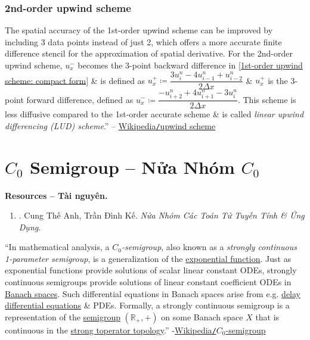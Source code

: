 \documentclass{article}
\begin{document}
\subsubsection{2nd-order upwind scheme}
The spatial accuracy of the 1st-order upwind scheme can be improved by including 3 data points instead of just 2, which offers a more accurate finite difference stencil for the approximation of spatial derivative. For the 2nd-order upwind scheme, $u_x^-$ becomes the 3-point backward difference in \eqref{1st-order upwind scheme: compact form} \& is defined as $u_x^+\coloneqq\dfrac{3u_i^n - 4u_{i-1}^n + u_{i-2}^n}{2\Delta x}$ \& $u_x^+$ is the 3-point forward difference, defined as $u_x^-\coloneqq\dfrac{-u_{i+2}^n + 4u_{i+1}^n - 3u_i^n}{2\Delta x}$. This scheme is less diffusive compared to the 1st-order accurate scheme \& is called {\it linear upwind differencing (LUD) scheme}.'' -- \href{https://en.wikipedia.org/wiki/Upwind_scheme}{Wikipedia{\tt/}upwind scheme}


\section{$C_0$ Semigroup -- Nửa Nhóm $C_0$}
\textbf{\textsf{Resources -- Tài nguyên.}}
\begin{enumerate}
	\item \cite{Anh_Ke_semigroup}. {\sc Cung Thế Anh, Trần Đình Kế}. {\it Nửa Nhóm Các Toán Tử Tuyến Tính \& Ứng Dụng}.
\end{enumerate}
``In mathematical analysis, a {\it $C_0$-semigroup}, also known as a {\it strongly continuous 1-parameter semigroup}, is a generalization of the \href{https://en.wikipedia.org/wiki/Exponential_function}{exponential function}. Just as exponential functions provide solutions of scalar linear constant ODEs, strongly continuous semigroups provide solutions of linear constant coefficient ODEs in \href{https://en.wikipedia.org/wiki/Banach_space}{Banach spaces}. Such differential equations in Banach spaces arise from e.g. \href{https://en.wikipedia.org/wiki/Delay_differential_equation}{delay differential equations} \& PDEs. Formally, a strongly continuous semigroup is a representation of the \href{https://en.wikipedia.org/wiki/Semigroup}{semigroup} $(\mathbb{R}_+,+)$ on some Banach space $X$ that is continuous in the \href{https://en.wikipedia.org/wiki/Strong_operator_topology}{strong toperator topology}.'' -\href{https://en.wikipedia.org/wiki/C0-semigroup}{Wikipedia{\tt/}$C_0$-semigroup}
\end{document}

